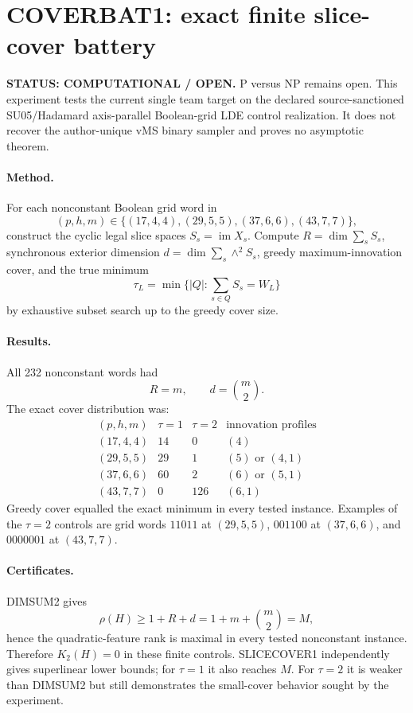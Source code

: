 \documentclass[11pt]{article}
\begin{document}
\section*{COVERBAT1: exact finite slice-cover battery}
\textbf{STATUS: COMPUTATIONAL / OPEN.} P versus NP remains open. This experiment tests the current single team target on the declared source-sanctioned SU05/Hadamard axis-parallel Boolean-grid LDE control realization. It does not recover the author-unique vMS binary sampler and proves no asymptotic theorem.

\paragraph{Method.}
For each nonconstant Boolean grid word in
\[
(p,h,m)\in\{(17,4,4),(29,5,5),(37,6,6),(43,7,7)\},
\]
construct the cyclic legal slice spaces \(S_s=\operatorname{im}X_s\). Compute
\(R=\dim\sum_sS_s\), synchronous exterior dimension
\(d=\dim\sum_s\wedge^2S_s\), greedy maximum-innovation cover, and the true minimum
\[
\tau_L=\min\{|Q|:\sum_{s\in Q}S_s=W_L\}
\]
by exhaustive subset search up to the greedy cover size.

\paragraph{Results.}
All 232 nonconstant words had
\[
\boxed{R=m,\qquad d=\binom m2.}
\]
The exact cover distribution was:
\[
\begin{array}{c|c|c|c}
(p,h,m)&\tau=1&\tau=2&\text{innovation profiles}\\\hline
(17,4,4)&14&0&(4)\\
(29,5,5)&29&1&(5)\text{ or }(4,1)\\
(37,6,6)&60&2&(6)\text{ or }(5,1)\\
(43,7,7)&0&126&(6,1)
\end{array}
\]
Greedy cover equalled the exact minimum in every tested instance. Examples of the \(\tau=2\) controls are grid words \(11011\) at \((29,5,5)\), \(001100\) at \((37,6,6)\), and \(0000001\) at \((43,7,7)\).

\paragraph{Certificates.}
DIMSUM2 gives
\[
\rho(H)\ge1+R+d=1+m+\binom m2=M,
\]
hence the quadratic-feature rank is maximal in every tested nonconstant instance. Therefore \(K_2(H)=0\) in these finite controls. SLICECOVER1 independently gives superlinear lower bounds; for \(\tau=1\) it also reaches \(M\). For \(\tau=2\) it is weaker than DIMSUM2 but still demonstrates the small-cover behavior sought by the experiment.
\end{document}
